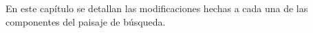 En este capítulo se detallan las modificaciones hechas a cada una de las componentes del paisaje de búsqueda.
